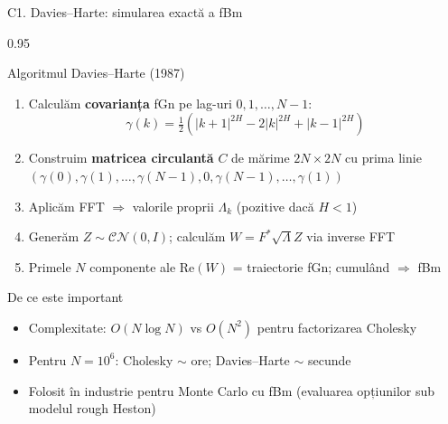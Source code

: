 \documentclass[9pt, aspectratio=169, t]{beamer}
\begin{document}
\begin{frame}[shrink=15]{C1. Davies--Harte: simularea exactă a fBm}
\begin{cminipage}{0.95\textwidth}
\begin{block}{Algoritmul Davies--Harte (1987)}
\begin{enumerate}\setlength{\itemsep}{1pt}
    \item Calculăm \textbf{covarianța} fGn pe lag-uri $0,1,\ldots,N-1$:
    \[ \gamma(k)=\tfrac12(|k+1|^{2H}-2|k|^{2H}+|k-1|^{2H}) \]
    \item Construim \textbf{matricea circulantă} $C$ de mărime $2N\times 2N$ cu prima linie $(\gamma(0),\gamma(1),\ldots,\gamma(N-1),0,\gamma(N-1),\ldots,\gamma(1))$
    \item Aplicăm FFT $\Rightarrow$ valorile proprii $\Lambda_k$ (pozitive dacă $H<1$)
    \item Generăm $Z\sim\mathcal{CN}(0,I)$; calculăm $W=F^*\sqrt\Lambda Z$ via inverse FFT
    \item Primele $N$ componente ale $\text{Re}(W)$ = traiectorie fGn; cumulând $\Rightarrow$ fBm
\end{enumerate}
\end{block}
\begin{exampleblock}{De ce este important}
\begin{itemize}\setlength{\itemsep}{0pt}
    \item Complexitate: $O(N\log N)$ vs $O(N^2)$ pentru factorizarea Cholesky
    \item Pentru $N=10^6$: Cholesky $\sim$ ore; Davies--Harte $\sim$ secunde
    \item Folosit în industrie pentru Monte Carlo cu fBm (evaluarea opțiunilor sub modelul rough Heston)
\end{itemize}
\end{exampleblock}
\end{cminipage}
\end{frame}
\end{document}
